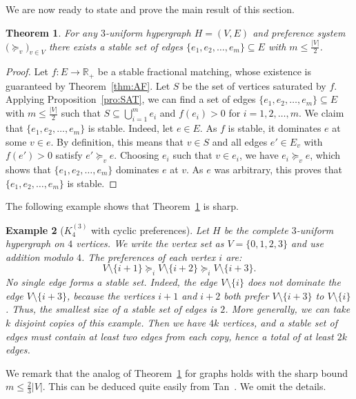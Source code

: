 \documentclass[10pt,a4paper]{amsart}
\newtheorem{theorem}{Theorem}[section]
\newtheorem{example}[theorem]{Example}
\begin{document}
We are now ready to state and prove the main result of this section.

\begin{theorem} \label{thm:GSH}
For any $3$-uniform hypergraph $H = (V, E)$ and preference system $\bigl( \succeq_v\bigr)_{v \in V}$ there exists a stable set of edges $\{e_1, e_2, \ldots , e_m\} \subseteq E$ with $m \le \frac{|V|}{2}$.
\end{theorem}

\begin{proof} Let $f: E \to \mathbb{R}_+$ be a stable fractional matching, whose existence is guaranteed by Theorem~\ref{thm:AF}. Let $S$ be the set of vertices saturated by $f$. Applying Proposition~\ref{pro:SAT}, we can find a set of edges $\{e_1, e_2, \ldots , e_m\} \subseteq E$ with $m \le \frac{|V|}{2}$ such that $S \subseteq \bigcup_{i=1}^m e_i$ and $f(e_i) > 0$ for $i=1,2, \ldots ,m$. We claim that $\{e_1, e_2, \ldots , e_m\}$ is stable. Indeed, let $e \in E$. As $f$ is stable, it dominates $e$ at some $v \in e$. By definition, this means that $v \in S$ and all edges $e' \in E_v$ with $f(e') > 0$ satisfy $e' \succeq_v e$. Choosing $e_i$ such that $v \in e_i$, we have $e_i \succeq_v e$, which shows that $\{e_1, e_2, \ldots , e_m\}$ dominates $e$ at $v$. As $e$ was arbitrary, this proves that $\{e_1, e_2, \ldots , e_m\}$ is stable.
\end{proof}

The following example shows that Theorem~\ref{thm:GSH} is sharp.
\begin{example}[$K^{(3)}_4$ with cyclic preferences]
Let $H$ be the complete $3$-uniform hypergraph on $4$ vertices. We write the vertex set as $V = \{0,1,2,3\}$ and use addition modulo $4$. The preferences of each vertex $i$ are: \[ V \setminus \{i+1\} \succeq_i V \setminus \{i+2\} \succeq_i V \setminus \{i+3\}.\] No single edge forms a stable set. Indeed, the edge $V \setminus \{i\}$ does not dominate the edge $V \setminus \{i+3\}$, because the vertices $i+1$ and $i+2$ both prefer $V \setminus \{i+3\}$ to $V \setminus \{i\}$. Thus, the smallest size of a stable set of edges is $2$. More generally, we can take $k$ disjoint copies of this example. Then we have $4k$ vertices, and a stable set of edges must contain at least two edges from each copy, hence a total of at least $2k$ edges.
\end{example}
We remark that the analog of Theorem~\ref{thm:GSH} for graphs holds with the sharp bound $m \le \frac{2}{3}|V|$. This can be deduced quite easily from Tan~\cite{Tan}. We omit the details.
\end{document}
